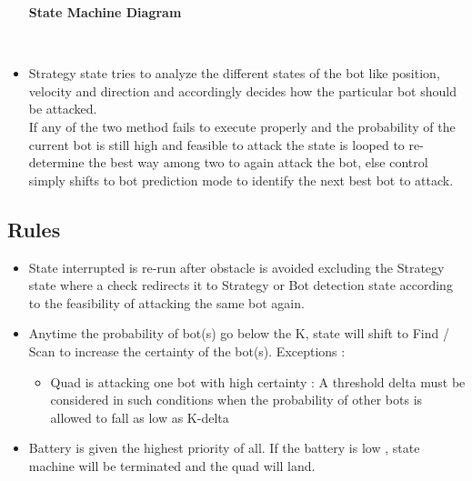 \documentclass[12pt]{article}
\begin{document}
\begin{itemize}
\begin{center}
\textbf{State Machine Diagram}\end{center}\\
\item{Strategy state tries to analyze the different states of the bot like position, velocity and direction and accordingly decides how the particular bot should be attacked.
}\\
If any of the two method fails to execute properly and the probability of the current bot is still high and feasible to attack the state is looped to re-determine the best way among two to again attack the bot, else control simply shifts to bot prediction mode to identify the next best bot to attack.
\end{itemize}
\subsection{Rules}
\begin{itemize}
\item{State interrupted is re-run after obstacle is avoided excluding the Strategy state where a check redirects it to Strategy or Bot detection state according to the feasibility of attacking the same bot again.
}
\item{Anytime the probability of bot(s) go below the K, state will shift to Find / Scan to increase the certainty of the bot(s). Exceptions :
}
\begin{itemize}
\item{Quad is attacking one bot with high certainty : A threshold delta must be considered in such conditions when the probability of other bots is allowed to fall as low as K-delta %
}
\end{itemize}
\item{Battery is given the highest priority of all. If the battery is low , state machine will be terminated and the quad will land.
}
\end{itemize}
\end{document}
